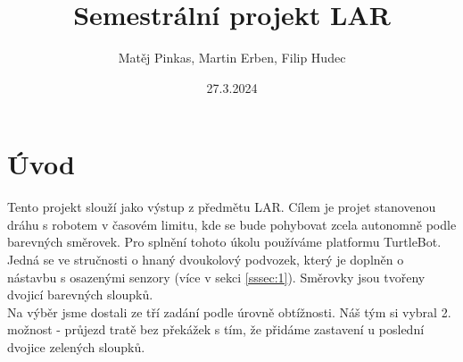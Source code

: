 \documentclass{article}
\title{Semestrální projekt LAR}
\author{Matěj Pinkas, Martin Erben, Filip Hudec}
\date{27.3.2024}
\begin{document}
\pagecolor{white}
\pagestyle{fancy}

\fancyhead{} %

\maketitle

\tableofcontents
\clearpage

\section{Úvod}
Tento projekt slouží jako výstup z předmětu LAR. Cílem je projet stanovenou dráhu s robotem v časovém limitu, kde se bude pohybovat zcela autonomně podle barevných směrovek. Pro splnění tohoto úkolu používáme platformu TurtleBot. Jedná se ve stručnosti o hnaný dvoukolový podvozek, který je doplněn o nástavbu s osazenými senzory (více v sekci \ref{sssec:1}). Směrovky jsou tvořeny dvojicí barevných sloupků.\\
Na výběr jsme dostali ze tří zadání podle úrovně obtížnosti. Náš tým si vybral 2. možnost - průjezd tratě bez překážek s tím, že přidáme zastavení u poslední dvojice zelených sloupků.
\end{document}
